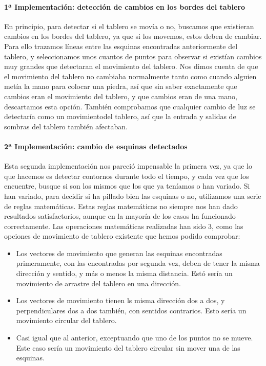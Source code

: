 \documentclass[12pt,a4paper]{report}
\begin{document}
\paragraph{1ª Implementación: detección de cambios en los bordes del tablero}

En principio, para detectar si el tablero se movía o no, buscamos que existieran
cambios en los bordes del tablero, ya que si los movemos, estos deben de
cambiar. Para ello trazamos líneas entre las esquinas encontradas anteriormente
del tablero, y seleccionamos unos cuantos de puntos para observar si
existían cambios muy grandes que detectaran el movimiento del tablero. Nos dimos
cuenta de que el movimiento del tablero no cambiaba normalmente tanto como
cuando alguien metía la mano para colocar una piedra, así que sin saber
exactamente que cambios eran el movimiento del tablero, y que cambios eran de
una mano, descartamos esta opción. También comprobamos que cualquier cambio de
luz se detectaría como un movimientodel tablero, así que la entrada y salidas de
sombras del tablero también afectaban. 

\paragraph{2ª Implementación: cambio de esquinas detectados} 

Esta segunda implementación nos pareció impensable la primera vez, ya que lo que
hacemos es detectar contornos durante todo el tiempo, y cada vez que los
encuentre, busque si son los mismos que los que ya teníamos o han variado. Si
han variado, para decidir si ha pillado bien las esquinas o no, utilizamos una
serie de reglas matemáticas. Estas reglas matemáticas no siempre nos han dado
resultados satisfactorios, aunque en la mayoría de los casos ha funcionado
correctamente. Las operaciones matemáticas realizadas han sido 3, como las
opciones de movimiento de tablero existente que hemos podido comprobar:
\begin{itemize}
    \item Los vectores de movimiento que generan las esquinas encontradas
    primeramente, con las encontradas por segunda vez, deben de tener la misma
    dirección y sentido, y más o menos la misma distancia. Estó sería un
    movimiento de arrastre del tablero en una dirección.
    \item Los vectores de movimiento tienen ls misma dirección dos a dos, y
    perpendiculares dos a dos también, con sentidos contrarios. Esto sería un
    movimiento circular del tablero.
    \item Casi igual que al anterior, exceptuando que uno de los puntos no se
    mueve. Este caso sería un movimiento del tablero circular sin mover una de
    las esquinas. 
\end{itemize}
\end{document}
